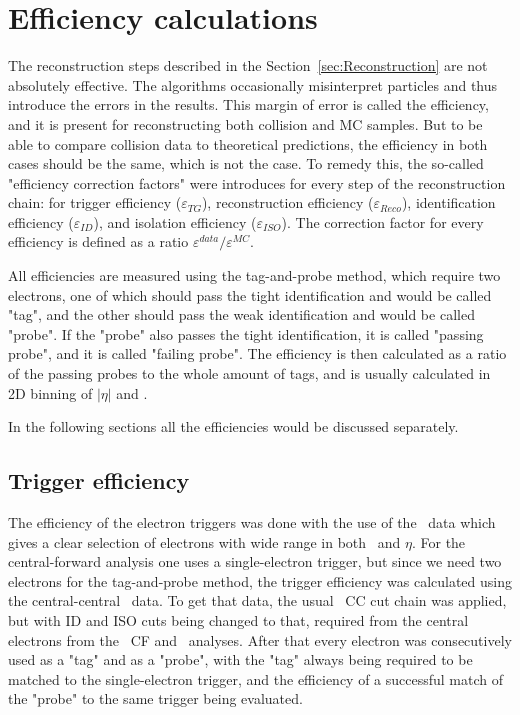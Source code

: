 \chapter{Efficiency calculations}
\label{sec:Efficiency}

The reconstruction steps described in the Section~\ref{sec:Reconstruction} are not absolutely effective. The algorithms occasionally misinterpret particles and thus introduce the errors in the results. This margin of error is called the efficiency, and it is present for reconstructing both collision and MC samples. But to be able to compare collision data to theoretical predictions, the efficiency in both cases should be the same, which is not the case. To remedy this, the so-called "efficiency correction factors" were introduces for every step of the reconstruction chain: for trigger efficiency ($\varepsilon_{TG}$), reconstruction efficiency ($\varepsilon_{Reco}$), identification efficiency ($\varepsilon_{ID}$), and isolation efficiency ($\varepsilon_{ISO}$). The correction factor for every efficiency is defined as a ratio $\varepsilon^{data}/\varepsilon^{MC}$.

All efficiencies are measured using the tag-and-probe method, which require two electrons, one of which should pass the tight identification and would be called "tag", and the other should pass the weak identification and would be called "probe". If the "probe" also passes the tight identification, it is called "passing probe", and it is called "failing probe". The efficiency is then calculated as a ratio of the passing probes to the whole amount of tags, and is usually calculated in 2D binning of $|\eta|$ and \pt.

In the following sections all the efficiencies would be discussed separately.

\section{Trigger efficiency}

The efficiency of the electron triggers was done with the use of the \Zee\ data which gives a clear selection of electrons with wide range in both \pt\ and $\eta$. For the central-forward analysis one uses a single-electron trigger, but since we need two electrons for the tag-and-probe method, the trigger efficiency was calculated using the central-central \Zee\ data. To get that data, the usual \Zee\ CC cut chain was applied, but with ID and ISO cuts being changed to that, required from the central electrons from the \Zee\ CF and \Wenu\ analyses. After that every electron was consecutively used as a "tag" and as a "probe", with the "tag" always being required to be matched to the single-electron trigger, and the efficiency of a successful match of the "probe" to the same trigger being evaluated.

